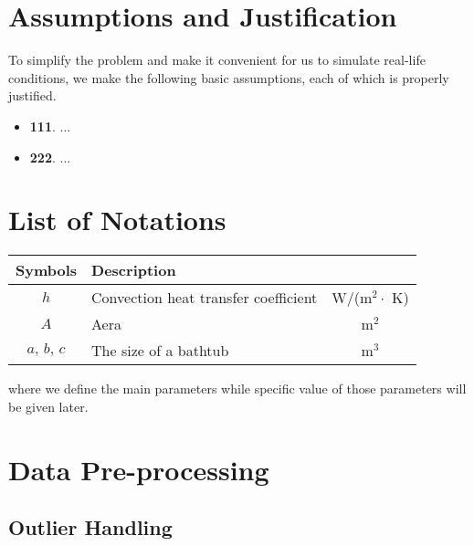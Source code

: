 \documentclass{mcmthesis}
\begin{document}
\section{Assumptions and Justification}

To simplify the problem and make it convenient for us to simulate real-life 
conditions, we make the following basic assumptions, each of which is properly 
justified.

\begin{itemize}
	\item {\bf 111}. ...
	\item {\bf 222}. ...	
\end{itemize}










\section{List of Notations}
\begin{center}
\begin{tabular}{clc}
	\toprule
	{\bf Symbols} & {\bf Description} & \quad {\bf Unit} \\
	\midrule 
	$h$ & Convection heat transfer coefficient & \quad W/(m$^2 \cdot$ K) \\[0.2cm]
	$A$ & Aera & \quad m$^2$ \\[0.2cm]
	$a,\,b,\,c$ & The size of a bathtub  & \quad m$^3$ \\
	\bottomrule
\end{tabular}
\end{center}

\noindent where we define the main parameters while specific value of those 
parameters will be given later.


\section{Data Pre-processing}
\subsection{Outlier Handling}
\end{document}
